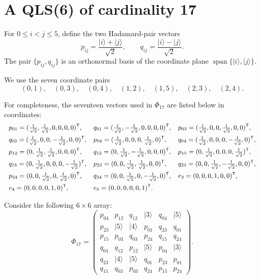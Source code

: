 \documentclass[a4paper,11pt]{article}
\newcommand{\ket}[1]{\lvert #1\rangle}
\begin{document}
\section{A QLS(6) of cardinality 17}

For $0\leq i<j\leq 5$, define the two Hadamard-pair vectors
\[
  p_{ij}=\frac{\ket{i}+\ket{j}}{\sqrt2},
  \qquad
  q_{ij}=\frac{\ket{i}-\ket{j}}{\sqrt2}.
\]
The pair $\{p_{ij},q_{ij}\}$ is an orthonormal basis of the coordinate plane
$\operatorname{span}\{\ket{i},\ket{j}\}$.

We use the seven coordinate pairs
\[
  (0,1),\quad (0,3),\quad (0,4),\quad (1,2),
  \quad (1,5),\quad (2,3),\quad (2,4).
\]

For completeness, the seventeen vectors used in $\Phi_{17}$ are listed below
in coordinates:
\[
\small
\begin{array}{lll}
 p_{01}=(\frac1{\sqrt2},\frac1{\sqrt2},0,0,0,0)^{\mathsf T},
& q_{01}=(\frac1{\sqrt2},-\frac1{\sqrt2},0,0,0,0)^{\mathsf T},
& p_{03}=(\frac1{\sqrt2},0,0,\frac1{\sqrt2},0,0)^{\mathsf T},\\[2mm]
 q_{03}=(\frac1{\sqrt2},0,0,-\frac1{\sqrt2},0,0)^{\mathsf T},
& p_{04}=(\frac1{\sqrt2},0,0,0,\frac1{\sqrt2},0)^{\mathsf T},
& q_{04}=(\frac1{\sqrt2},0,0,0,-\frac1{\sqrt2},0)^{\mathsf T},\\[2mm]
 p_{12}=(0,\frac1{\sqrt2},\frac1{\sqrt2},0,0,0)^{\mathsf T},
& q_{12}=(0,\frac1{\sqrt2},-\frac1{\sqrt2},0,0,0)^{\mathsf T},
& p_{15}=(0,\frac1{\sqrt2},0,0,0,\frac1{\sqrt2})^{\mathsf T},\\[2mm]
 q_{15}=(0,\frac1{\sqrt2},0,0,0,-\frac1{\sqrt2})^{\mathsf T},
& p_{23}=(0,0,\frac1{\sqrt2},\frac1{\sqrt2},0,0)^{\mathsf T},
& q_{23}=(0,0,\frac1{\sqrt2},-\frac1{\sqrt2},0,0)^{\mathsf T},\\[2mm]
 p_{24}=(0,0,\frac1{\sqrt2},0,\frac1{\sqrt2},0)^{\mathsf T},
& q_{24}=(0,0,\frac1{\sqrt2},0,-\frac1{\sqrt2},0)^{\mathsf T},
& e_3=(0,0,0,1,0,0)^{\mathsf T},\\[2mm]
 e_4=(0,0,0,0,1,0)^{\mathsf T},
& e_5=(0,0,0,0,0,1)^{\mathsf T}.&
\end{array}
\]

Consider the following $6\times6$ array:
\[
\Phi_{17}=
\begin{pmatrix}
 p_{04}&p_{12}&q_{12}&\ket{3}&q_{04}&\ket{5}\\
 p_{23}&\ket{5}&\ket{4}&p_{01}&q_{23}&q_{01}\\
 p_{15}&p_{03}&q_{03}&p_{24}&q_{15}&q_{24}\\
 q_{04}&q_{12}&p_{12}&\ket{5}&p_{04}&\ket{3}\\
 q_{23}&\ket{4}&\ket{5}&q_{01}&p_{23}&p_{01}\\
 q_{15}&q_{03}&p_{03}&q_{24}&p_{15}&p_{24}
\end{pmatrix}.
\]
\end{document}
